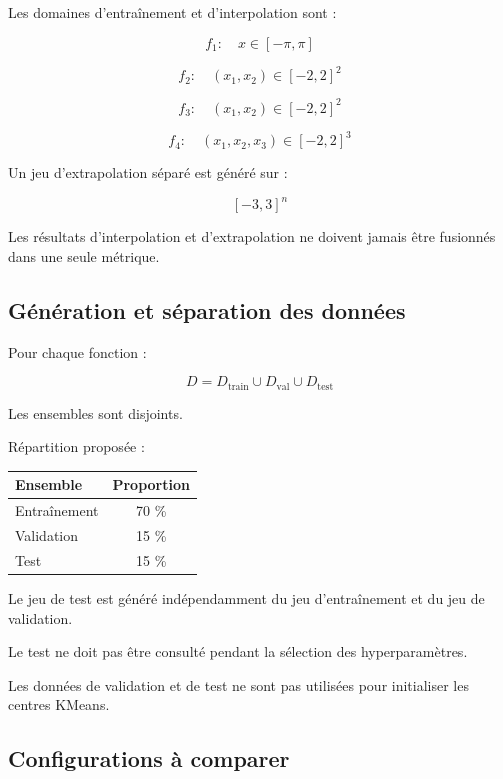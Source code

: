 \documentclass[11pt,a4paper]{article}
\begin{document}
Les domaines d'entraînement et d'interpolation sont :

\[
f_1:\quad x\in[-\pi,\pi]
\]

\[
f_2:\quad (x_1,x_2)\in[-2,2]^2
\]

\[
f_3:\quad (x_1,x_2)\in[-2,2]^2
\]

\[
f_4:\quad (x_1,x_2,x_3)\in[-2,2]^3
\]

Un jeu d'extrapolation séparé est généré sur :

\[
[-3,3]^n
\]

Les résultats d'interpolation et d'extrapolation
ne doivent jamais être fusionnés dans une seule métrique.

\subsection{Génération et séparation des données}

Pour chaque fonction :

\[
D=
D_{\mathrm{train}}
\cup
D_{\mathrm{val}}
\cup
D_{\mathrm{test}}
\]

Les ensembles sont disjoints.

Répartition proposée :

\begin{center}
\begin{tabular}{lc}
\toprule
Ensemble & Proportion \\
\midrule
Entraînement & 70 \% \\
Validation & 15 \% \\
Test & 15 \% \\
\bottomrule
\end{tabular}
\end{center}

Le jeu de test est généré indépendamment du jeu
d'entraînement et du jeu de validation.

Le test ne doit pas être consulté pendant
la sélection des hyperparamètres.

Les données de validation et de test ne sont pas
utilisées pour initialiser les centres KMeans.

\subsection{Configurations à comparer}
\end{document}
